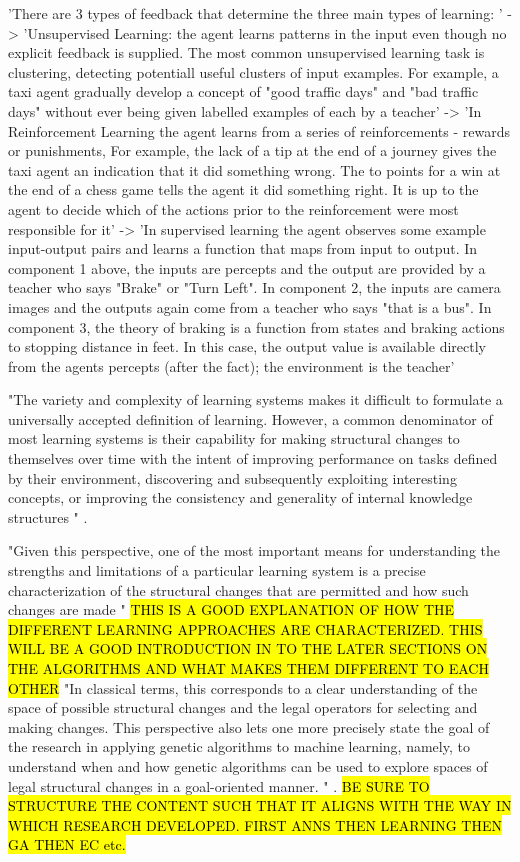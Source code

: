 'There are 3 types of feedback that determine the three main types of learning: ' \cite{russell2016artificial}
-> 'Unsupervised Learning: the agent learns patterns in the input even though no explicit feedback is supplied. The most common unsupervised learning task is clustering, detecting potentiall useful clusters of input examples. For example, a taxi agent gradually develop a concept of "good traffic days" and "bad traffic days" without ever being given labelled examples of each by a teacher'
-> 'In Reinforcement Learning the agent learns from a series of reinforcements - rewards or punishments, For example, the lack of a tip at the end of a journey gives the taxi agent an indication that it did something wrong. The to points for a win at the end of a chess game tells the agent it did something right. It is up to the agent to decide which of the actions prior to the reinforcement were most responsible for it'
-> 'In supervised learning the agent observes some example input-output pairs and learns a function that maps from input to output. In component 1 above, the inputs are percepts and the output are provided by a teacher who says "Brake" or "Turn Left". In component 2, the inputs are camera images and the outputs again come from a teacher who says "that is a bus". In component 3, the theory of braking is a function from states and braking actions to stopping distance in feet. In this case, the output value is available directly from the agents percepts (after the fact); the environment is the teacher'


"The variety and complexity of learning systems makes it difficult to formulate a universally accepted definition of learning. However, a common denominator of most learning systems is their capability for making structural changes to themselves over time with the intent of improving performance on tasks defined by their environment, discovering and subsequently exploiting interesting concepts, or improving the consistency and generality of internal knowledge structures " \cite{de1988learning}.

"Given this perspective, one of the most important means for understanding the strengths and limitations of a particular learning system is a precise characterization of the structural changes that are permitted and how such changes are made " \cite{de1988learning} \hl{THIS IS A GOOD EXPLANATION OF HOW THE DIFFERENT LEARNING APPROACHES ARE CHARACTERIZED. THIS WILL BE A GOOD INTRODUCTION IN TO THE LATER SECTIONS ON THE ALGORITHMS AND WHAT MAKES THEM DIFFERENT TO EACH OTHER}
"In classical terms, this corresponds to a clear understanding of the space of possible structural changes and the legal operators for selecting and making changes. This perspective also lets one more precisely state the goal of the research in applying genetic algorithms to machine learning, namely, to understand when and how genetic algorithms can be used to explore spaces of legal structural changes in a goal-oriented manner. " \cite{de1988learning}.
\hl{BE SURE TO STRUCTURE THE CONTENT SUCH THAT IT ALIGNS WITH THE WAY IN WHICH RESEARCH DEVELOPED. FIRST ANNS THEN LEARNING THEN GA THEN EC etc.}




